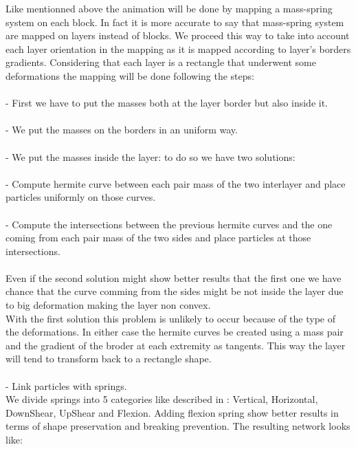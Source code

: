 \documentclass[12pt, a4paper]{memoir} %
\begin{document}
Like mentionned above the animation will be done by mapping a mass-spring system on each block. In fact it is more accurate to say that mass-spring system are mapped on layers instead of blocks. We proceed this way to take into account each layer orientation in the mapping as it is mapped according to layer's borders gradients. Considering that each layer is a rectangle that underwent some deformations the mapping will be done following the steps:	\\\\		
\indent	- First we have to put the masses both at the layer border but also inside it.\\\\
\indent	- We put the masses on the borders in an uniform way.\\\\
\indent	- We put the masses inside the layer: to do so we have two solutions:\\\\
\indent \indent	- Compute hermite curve between each pair mass of the two interlayer and place particles uniformly on those curves.\\\\
\indent \indent	- Compute the intersections between the previous hermite curves and the  one coming from each pair mass of the two sides and place particles at those intersections.\\\\
	Even if the second solution might show better results that the first one we have chance that the curve comming from the sides might be not inside the layer due to big deformation making the layer non convex. \\With the first solution this problem is unlikely to occur because of the type of the deformations. In either case the hermite curves be created using a mass pair and the gradient of the broder at each extremity as tangents. This way the layer will tend to transform back to a rectangle shape.\\\\
\indent	- Link particles with springs. \\We divide springs into 5 categories like described in \citep{cloth}: Vertical, Horizontal, DownShear, UpShear and Flexion. Adding flexion spring show better results in terms of shape preservation and breaking prevention. The resulting network looks like:\\
	
\end{document}

